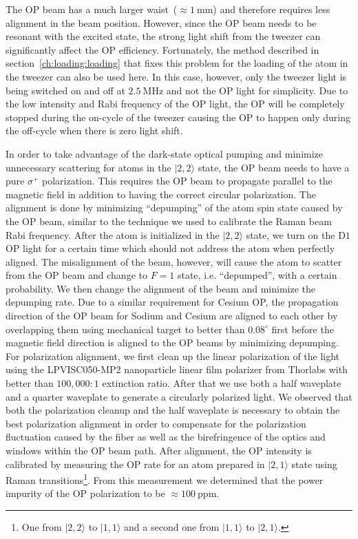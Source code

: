 The OP beam has a much larger waist~($\approx\!1~\mathrm{mm}$)
and therefore requires less alignment in the beam position.
However, since the OP beam needs to be resonant with the excited state,
the strong light shift from the tweezer can significantly affect the OP efficiency.
Fortunately, the method described in section~\ref{ch:loading:loading}
that fixes this problem for the loading of the atom in the tweezer can also be used here.
In this case, however, only the tweezer light is being switched on and off at $2.5~\mathrm{MHz}$
and not the OP light for simplicity.
Due to the low intensity and Rabi frequency of the OP light,
the OP will be completely stopped during the on-cycle of the tweezer
causing the OP to happen only during the off-cycle when there is zero light shift.

In order to take advantage of the dark-state optical pumping and
minimize unnecessary scattering for atoms in the $|2,2\rangle$ state,
the OP beam needs to have a pure $\sigma^+$ polarization.
This requires the OP beam to propagate parallel to the magnetic field
in addition to having the correct circular polarization.
The alignment is done by minimizing ``depumping'' of the atom spin state caused by the OP beam,
similar to the technique we used to calibrate the Raman beam Rabi frequency.
After the atom is initialized in the $|2,2\rangle$ state, we turn on the $\mathrm{D1}$ OP light
for a certain time which should not address the atom when perfectly aligned.
The misalignment of the beam, however, will cause the atom to scatter from the OP beam
and change to $F=1$ state, i.e. ``depumped'', with a certain probability.
We then change the alignment of the beam and minimize the depumping rate.
Due to a similar requirement for Cesium OP, the propagation direction of
the OP beam for Sodium and Cesium are aligned to each other by overlapping them
using mechanical target to better than $0.08^\circ$ first
before the magnetic field direction is aligned to the OP beams by minimizing depumping.
For polarization alignment, we first clean up the linear polarization of the light
using the LPVISC050-MP2  nanoparticle linear film polarizer from Thorlabs
with better than $100,000:1$ extinction ratio.
After that we use both a half waveplate and a quarter waveplate
to generate a circularly polarized light.
We observed that both the polarization cleanup and the half waveplate is necessary
to obtain the best polarization alignment in order to compensate for the polarization
fluctuation caused by the fiber as well as the birefringence of the optics and windows
within the OP beam path. After alignment, the OP intensity is calibrated
by measuring the OP rate for an atom prepared in $|2,1\rangle$ state
using Raman transitions\footnote{One from $|2,2\rangle$ to $|1,1\rangle$
  and a second one from $|1,1\rangle$ to $|2,1\rangle$.}.
From this measurement we determined that the power impurity of the OP polarization
to be $\approx\!100~\mathrm{ppm}$.

